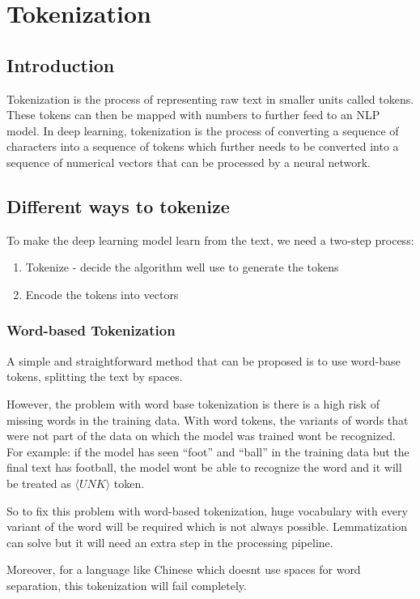 \chapter{Tokenization}
\section{Introduction}
Tokenization is the process of representing raw text in smaller units called tokens. These tokens can then be mapped with numbers to further feed to an NLP model. In deep learning, tokenization is the process of converting a sequence of characters into a sequence of tokens which further needs to be converted into a sequence of numerical vectors that can be processed by a neural network.

\section{Different ways to tokenize}
To make the deep learning model learn from the text, we need a two-step process:
\begin{enumerate}
    \item Tokenize - decide the algorithm we\textquotesingle ll use to generate the tokens
    \item Encode the tokens into vectors
\end{enumerate}

\subsection{Word-based Tokenization}
A simple and straightforward method that can be proposed is to use word-base tokens, splitting the text by spaces.

However, the problem with word base tokenization is there is a high risk of missing words in the training data. With word tokens, the variants of words that were not part of the data on which the model was trained won\textquotesingle t be recognized. For example: if the model has seen “foot” and “ball” in the training data but the final text has football, the model won\textquotesingle t be able to recognize the word and it will be treated as $\langle UNK \rangle$ token.

So to fix this problem with word-based tokenization, huge vocabulary with every variant of the word will be required which is not always possible. Lemmatization can solve but it will need an extra step in the processing pipeline. 

Moreover, for a language like Chinese which doesn\textquotesingle t use spaces for word separation, this tokenization will fail completely.

